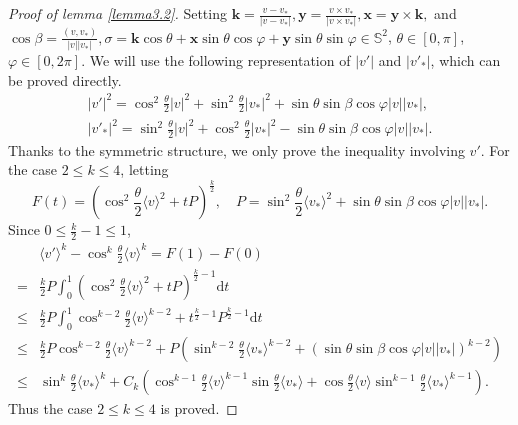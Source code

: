 \documentclass[reqno,10pt]{amsart}
\let\b=\beta
\let\vf=\varphi
\def\th{\theta}
\newcommand{\beno}{\begin{eqnarray*}}
\newcommand{\eeno}{\end{eqnarray*}}
\theoremstyle{definition}
\numberwithin{equation}{section}
\begin{document}
\begin{proof}[Proof of lemma \ref{lemma3.2}]
    Setting $\mathbf{k}=\frac{v-v_*}{|v-v_*|},\mathbf{y}=\frac{v \times v_*}{\left|v \times v_*\right|},\mathbf{x}=\mathbf{y} \times \mathbf{k},$ and $\cos\b=\frac{(v,v_*)}{|v||v_*|},\sigma=\mathbf{k} \cos \theta+\mathbf{x} \sin \theta \cos \varphi+\mathbf{y} \sin \theta \sin \varphi\in \mathbb{S}^2$, $\th\in[0,\pi]$, $\vf\in[0,2\pi]$.
    We will use the following representation of $|v'|$ and $|v'_*|$, which can be proved directly.
    \beno
|v'|^2=\cos^2\frac{\th}{2}|v|^2+\sin^2\frac{\th}{2}|v_*|^2+\sin\th\sin\beta\cos\vf|v||v_*|,\\
|v'_*|^2=\sin^2\frac{\th}{2}|v|^2+\cos^2\frac{\th}{2}|v_*|^2-\sin\th\sin\beta\cos\vf|v||v_*|.
    \eeno
    Thanks to the symmetric structure, we only prove the inequality involving $v'$.
    For the case $2\le k\le 4$, letting 
    $$
    F(t)=(\cos^2\frac{\th}{2}\langle v\rangle^2+tP)^{\frac{k}{2}},\quad P=\sin^2\frac{\th}{2}\langle v_*\rangle^{2}+\sin\th\sin\beta\cos\vf|v||v_*|.$$
    Since $0\le \frac{k}{2}-1\le1$,
    $$
    \begin{aligned}
    &\langle v'\rangle^k-\cos^k\frac{\th}{2}\langle v\rangle^k=F(1)-F(0)\\
    =&\frac{k}{2}P\int_0^1(\cos^2\frac{\th}{2}\langle v\rangle^2+tP)^{\frac{k}{2}-1}\mathrm{d}t\\
    \le & \frac{k}{2}P\int_0^1 \cos^{k-2}\frac{\th}{2}\langle v\rangle^{k-2}+t^{\frac{k}{2}-1}P^{\frac{k}{2}-1}\mathrm{d}t\\
    \le & \frac{k}{2}P\cos^{k-2}\frac{\th}{2}\langle v\rangle^{k-2}+P(\sin^{k-2}\frac{\th}{2}\langle v_*\rangle^{k-2}+(\sin\th\sin\beta\cos\vf|v||v_*|)^{k-2})\\
    \le & \sin^{k}\frac{\th}{2}\langle v_*\rangle^{k}+C_k(\cos^{k-1}\frac{\th}{2}\langle v\rangle^{k-1}\sin\frac{\th}{2}\langle v_*\rangle+\cos\frac{\th}{2}\langle v\rangle\sin^{k-1}\frac{\th}{2}\langle v_*\rangle^{k-1}).
    \end{aligned}
    $$
   Thus the case $2\le k\le 4$ is proved.
    

\end{proof}
\end{document}
